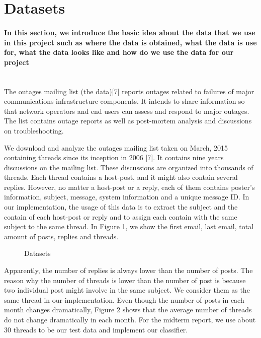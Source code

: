 \documentclass{sig-alternate}
\begin{document}
\section{Datasets}
\paragraph{In this section, we introduce the basic idea about the data that we use in this project such as where the data is obtained, what the data is use for, what the data looks like and how do we use the data for our project}
~\\
The outages mailing list (the data)[7] reports outages related to failures of major communications infrastructure components. It intends to share information so that network operators and end users can assess and respond to major outages. The list contains outage reports as well as post-mortem analysis and discussions on troubleshooting. 						
\par We download and analyze the outages mailing list taken on March, 2015 containing threads since its inception in 2006 [7]. It contains nine years discussions on the mailing list. These discussions are organized into thousands of  threads. Each thread contains a host-post, and it might also contain several replies. However, no matter a host-post or a reply, each of them contains poster’s information, subject, message, system information and a unique message ID. In our implementation, the usage of this data is to extract the subject and the contain of each host-post or reply and to assign each contain with the same subject to the same thread. In Figure 1, we show the first email, last email, total amount of posts, replies and threads.

\begin{figure}[h]
\centering
{}
\caption{Datasets}
\end{figure}

\par Apparently, the number of replies is always lower than the number of posts. The reason why the number of threads is lower than the number of post is because two individual post might involve in the same subject. We consider them as the same thread in our implementation. Even though the number of posts in each month changes dramatically, Figure 2 shows that the average number of threads do not change dramatically in each month. For the midterm report, we use about 30 threads to be our test data and implement our classifier. 
\end{document}
